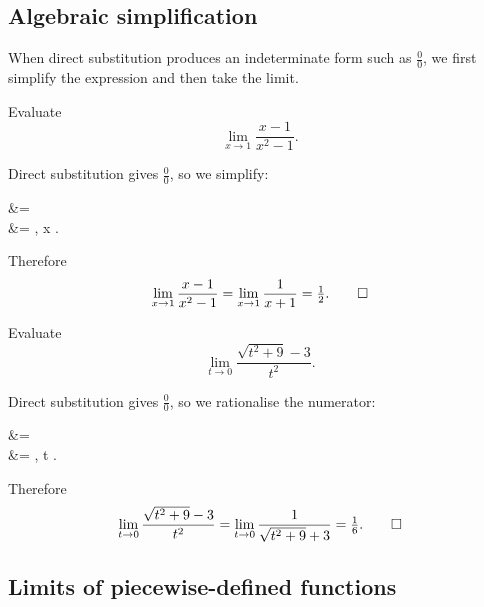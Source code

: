 \subsection{Algebraic simplification}

When direct substitution produces an indeterminate form such as \(\tfrac{0}{0}\), we first simplify the expression and then take the limit.

\begin{workedexample}
\begin{example}
Evaluate
\[
\lim_{x \to 1} \frac{x - 1}{x^{2} - 1}.
\]
\end{example}

\begin{solution}
Direct substitution gives \(\tfrac{0}{0}\), so we simplify:
\begin{aligneddisplay}
 &= \\
&= , \qquad x .
\end{aligneddisplay}
Therefore
\[
\lim_{x \to 1} \frac{x - 1}{x^{2} - 1} = \lim_{x \to 1} \frac{1}{x + 1} = \tfrac{1}{2}. \qedhere
\]
\end{solution}
\end{workedexample}

\begin{workedexample}
\begin{example}
Evaluate
\[
\lim_{t \to 0} \frac{\sqrt{t^{2} + 9} - 3}{t^{2}}.
\]
\end{example}

\begin{solution}
Direct substitution gives \(\tfrac{0}{0}\), so we rationalise the numerator:
\begin{aligneddisplay}
\cdot
{}
&= \\
&= , \qquad t .
\end{aligneddisplay}
Therefore
\[
\lim_{t \to 0} \frac{\sqrt{t^{2} + 9} - 3}{t^{2}} = \lim_{t \to 0} \frac{1}{\sqrt{t^{2} + 9} + 3} = \tfrac{1}{6}. \qedhere
\]
\end{solution}
\end{workedexample}

\subsection{Limits of piecewise-defined functions}

